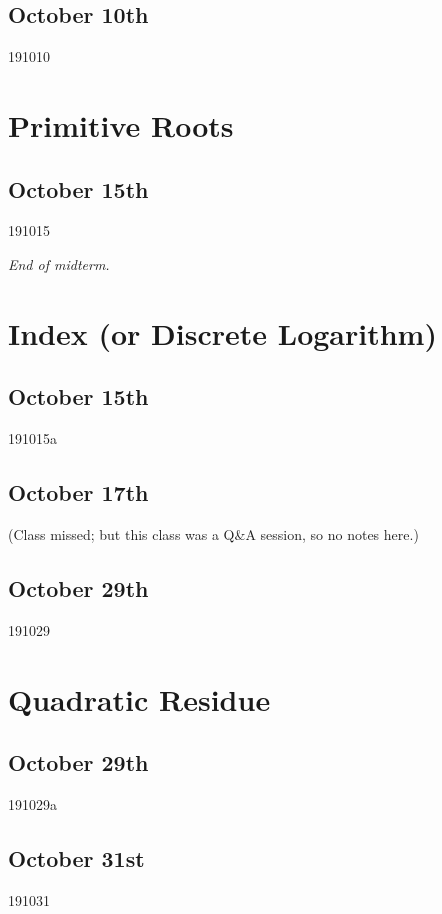 \subsection{October 10th}
{191010}

\section{Primitive Roots}
\subsection{October 15th}
{191015}

\noindent\makebox[\linewidth]{\rule{\linewidth}{0.4pt}}
\begin{flushright}
    \textit{End of midterm.}
\end{flushright}

\newpage
\section{Index (or Discrete Logarithm)}
\subsection{October 15th}
{191015a}

\subsection{October 17th}
(Class missed; but this class was a Q\&A session, so no notes here.)

\subsection{October 29th}
{191029}

\section{Quadratic Residue}

\subsection{October 29th}
{191029a}

\subsection{October 31st}
{191031}

